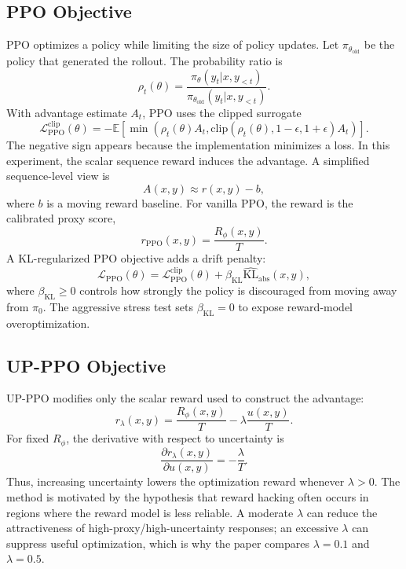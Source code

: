 \documentclass[11pt]{article}
\newcommand{\Rphi}{R_{\phi}}
\newcommand{\kl}{\mathrm{KL}}
\begin{document}
\subsection{PPO Objective}
PPO optimizes a policy while limiting the size of policy updates. Let $\pi_{\theta_{\mathrm{old}}}$ be the policy that generated the rollout. The probability ratio is
\begin{equation}
    \rho_t(\theta)=
    \frac{\pi_\theta(y_t|x,y_{<t})}
         {\pi_{\theta_{\mathrm{old}}}(y_t|x,y_{<t})}.
\end{equation}
With advantage estimate $A_t$, PPO uses the clipped surrogate
\begin{equation}
    \mathcal{L}_{\mathrm{PPO}}^{\mathrm{clip}}(\theta)
    =-\mathbb{E}\left[
    \min\left(\rho_t(\theta)A_t,
    \mathrm{clip}(\rho_t(\theta),1-\epsilon,1+\epsilon)A_t\right)
    \right].
\end{equation}
The negative sign appears because the implementation minimizes a loss. In this experiment, the scalar sequence reward induces the advantage. A simplified sequence-level view is
\begin{equation}
    A(x,y)\approx r(x,y)-b,
\end{equation}
where $b$ is a moving reward baseline. For vanilla PPO, the reward is the calibrated proxy score,
\begin{equation}
    r_{\mathrm{PPO}}(x,y)=\frac{\Rphi(x,y)}{T}.
\end{equation}
A KL-regularized PPO objective adds a drift penalty:
\begin{equation}
    \mathcal{L}_{\mathrm{PPO}}(\theta)
    =\mathcal{L}_{\mathrm{PPO}}^{\mathrm{clip}}(\theta)
    +\beta_{\mathrm{KL}}\widehat{\kl}_{\mathrm{abs}}(x,y),
\end{equation}
where $\beta_{\mathrm{KL}}\geq 0$ controls how strongly the policy is discouraged from moving away from $\pi_0$. The aggressive stress test sets $\beta_{\mathrm{KL}}=0$ to expose reward-model overoptimization.

\subsection{UP-PPO Objective}
UP-PPO modifies only the scalar reward used to construct the advantage:
\begin{equation}
    r_\lambda(x,y)=\frac{\Rphi(x,y)}{T}-\lambda\frac{u(x,y)}{T}.
\end{equation}
For fixed $\Rphi$, the derivative with respect to uncertainty is
\begin{equation}
    \frac{\partial r_\lambda(x,y)}{\partial u(x,y)}=-\frac{\lambda}{T}.
\end{equation}
Thus, increasing uncertainty lowers the optimization reward whenever $\lambda>0$. The method is motivated by the hypothesis that reward hacking often occurs in regions where the reward model is less reliable. A moderate $\lambda$ can reduce the attractiveness of high-proxy/high-uncertainty responses; an excessive $\lambda$ can suppress useful optimization, which is why the paper compares $\lambda=0.1$ and $\lambda=0.5$.
\end{document}
